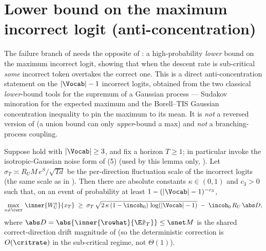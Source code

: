 \section{Lower bound on the maximum incorrect logit (anti-concentration)}
\label{sec:incorrect_max_lower}

The failure branch of  needs the opposite of
: a high-probability \emph{lower} bound on the
maximum incorrect logit, showing that when the descent rate is
sub-critical \emph{some} incorrect token overtakes the correct one. This
is a direct anti-concentration statement on the $|\Vocab|-1$ incorrect
logits, obtained from the two classical \emph{lower}-bound tools for the
supremum of a Gaussian process --- Sudakov minoration for the expected
maximum and the Borell--TIS Gaussian concentration inequality to pin the
maximum to its mean. It is \emph{not} a reversed version of
 (a union bound can only \emph{upper}-bound a max)
and \emph{not} a branching-process coupling.

\begin{lemma}
\label{lem:incorrect_max_lower}
Suppose  hold with
$|\Vocab|\ge3$, and fix a horizon $T\ge1$; in particular invoke the
isotropic-Gaussian noise form  of
(5) (used by this lemma only,
). Let
$\sigma_T\asymp R_U M\,e^S/\sqrt{T d}$ be the per-direction fluctuation
scale of the incorrect logits (the same scale as in
). Then there are absolute constants
$\kappa\in(0,1)$ and $c_3>0$ such that, on an event of probability at least
$1-(|\Vocab|-1)^{-c_3}$,
\begin{align}\label{eq:incorrect_max_lower_bound}
   \max_{a\neq\corr}\, \inner{W_U^a}{x_T}
   \;\ge\;
   \sigma_T\,\sqrt{2\,\kappa\,(1-\incoh_0)\,\log(|\Vocab|-1)}
   \;-\;
   \incoh_0\, R_U\, \abs D,
\end{align}
where $\abs D=\abs{\inner{\rowhat}{\E\tilde x_T}}\le\snet M$ is the shared
correct-direction drift magnitude of  (so the
deterministic correction is $O(\critrate)$ in the sub-critical regime, not
$\Theta(1)$).
\end{lemma}

